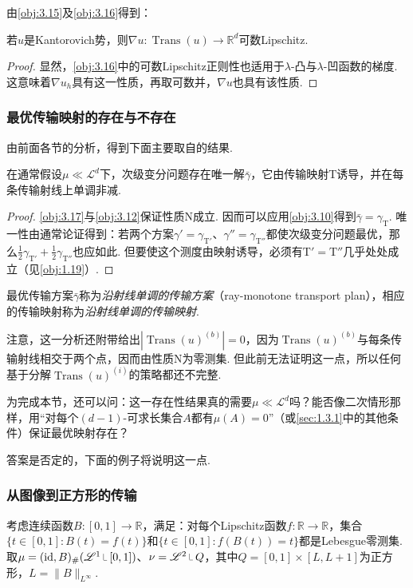 由\autoref{obj:3.15}及\autoref{obj:3.16}得到：
\begin{proposition}\label{obj:3.17}
若$u$是Kantorovich势，则$\nabla u:\operatorname{Trans}(u)\to\mathbb R^d$可数Lipschitz.
\end{proposition}
\begin{proof}
显然，\autoref{obj:3.16}中的可数Lipschitz正则性也适用于$\lambda$-凸与$\lambda$-凹函数的梯度. 这意味着$\nabla u_h$具有这一性质，再取可数并，$\nabla u$也具有该性质.
\end{proof}

\subsubsection{最优传输映射的存在与不存在}\label{sec:3.1.4}
由前面各节的分析，得到下面主要取自\cite{b10,b14,b44}的结果.
\begin{theorem}\label{obj:3.18}
在通常假设$\mu\ll\mathscr L^d$下，次级变分问题存在唯一解$\bar\gamma$，它由传输映射$\mathrm T$诱导，并在每条传输射线上单调非减.
\end{theorem}
\begin{proof}
\autoref{obj:3.17}与\autoref{obj:3.12}保证性质N成立. 因而可以应用\autoref{obj:3.10}得到$\bar\gamma=\gamma_{\mathrm T}$. 唯一性由通常论证得到：若两个方案$\gamma'=\gamma_{\mathrm T'}$、$\gamma''=\gamma_{\mathrm T''}$都使次级变分问题最优，那么$\frac12\gamma_{\mathrm T'}+\frac12\gamma_{\mathrm T''}$也应如此. 但要使这个测度由映射诱导，必须有$\mathrm T'=\mathrm T''$几乎处处成立（见\autoref{obj:1.19}）.
\end{proof}

\begin{definition}\label{obj:3.19}
最优传输方案$\bar\gamma$称为\emph{沿射线单调的传输方案}（ray-monotone transport plan），相应的传输映射称为\emph{沿射线单调的传输映射}.
\end{definition}
注意，这一分析还附带给出$|\operatorname{Trans}(u)^{(b)}|=0$，因为$\operatorname{Trans}(u)^{(b)}$与每条传输射线相交于两个点，因而由性质N为零测集. 但此前无法证明这一点，所以任何基于分解$\operatorname{Trans}(u)^{(i)}$的策略都还不完整.

为完成本节，还可以问：这一存在性结果真的需要$\mu\ll\mathscr L^d$吗？能否像二次情形那样，用“对每个$(d-1)$-可求长集合$A$都有$\mu(A)=0$”（或\autoref{sec:1.3.1}中的其他条件）保证最优映射存在？

答案是否定的，下面的例子将说明这一点.
\subsubsection*{从图像到正方形的传输}
考虑连续函数$B:[0,1]\to\mathbb R$，满足：对每个Lipschitz函数$f:\mathbb R\to\mathbb R$，集合$\{t\in[0,1]:B(t)=f(t)\}$和$\{t\in[0,1]:f(B(t))=t\}$都是Lebesgue零测集. 取$\mu=(\mathrm{id},B)_\#(\mathscr L^1\restr[0,1])$、$\nu=\mathscr L^2\restr Q$，其中$Q=[0,1]\times[L,L+1]$为正方形，$L=\|B\|_{L^\infty}$.

